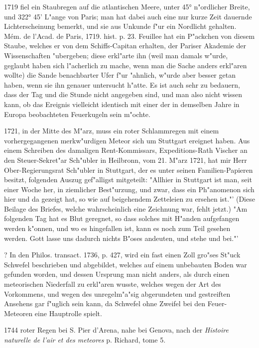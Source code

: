 \documentclass[a4paper, 11pt, oneside, polutonikogreek, german]{article}
\begin{document}
1719 fiel ein Staubregen auf die atlantischen Meere, unter 45° n"ordlicher Breite, und 322° 45' L"ange von Paris; man hat dabei auch eine nur kurze Zeit dauernde Lichterscheinung bemerkt, und sie aus Unkunde f"ur ein Nordlicht gehalten. Mém. de l'Acad. de Paris, 1719. hist. p. 23. Feuillee hat ein P"ackchen von diesem Staube, welches er von dem Schiffs-Capitan erhalten, der Pariser Akademie der Wissenschaften "ubergeben; diese erkl"arte ihn (weil man damals w"urde, geglaubt haben sich l"acherlich zu mache, wenn man die Sache anders erkl"aren wollte) die Sande benachbarter Ufer f"ur "ahnlich, w"urde aber besser getan haben, wenn sie ihn genauer untersucht h"atte. Es ist auch sehr zu bedauern, dass der Tag und die Stunde nicht angegeben sind, und man also nicht wissen kann, ob das Ereignis vielleicht identisch mit einer der in demselben Jahre in Europa beobachteten Feuerkugeln sein m"ochte.

1721, in der Mitte des M"arz, muss ein roter Schlammregen mit einem vorhergegangenen merkw"urdigen Meteor sich um Stuttgart ereignet haben. Aus einem Schreiben des damaligen Rent-Kommissars, Expeditions-Rath Vischer an den Steuer-Sekret"ar Sch"ubler in Heilbronn, vom 21. M"arz 1721, hat mir Herr Ober-Regierungsrat Sch"ubler in Stuttgart, der es unter seinen Familien-Papieren besitzt, folgenden Auszug gef"alligst mitgeteilt: "Allhier in Stuttgart ist man, seit einer Woche her, in ziemlicher Best"urzung, und zwar, dass ein Ph"anomenon sich hier und da gezeigt hat, so wie auf beigehendem Zetteleien zu ersehen ist."' (Diese Beilage des Briefes, welche wahrscheinlich eine Zeichnung war, fehlt jetzt.) "Am folgenden Tag hat es Blut geregnet, so dass solches mit H"anden aufgefangen werden k"onnen, und wo es hingefallen ist, kann es noch zum Teil gesehen werden. Gott lasse uns dadurch nichts B"oses andeuten, und stehe und bei."'

? In den Philos. transact. 1736, p. 427, wird ein fast einen Zoll gro"ses St"uck Schwefel beschrieben und abgebildet, welches auf einem unbebauten Boden war gefunden worden, und dessen Ursprung man nicht anders, als durch einen meteorischen Niederfall zu erkl"aren wusste, welches wegen der Art des Vorkommens, und wegen des unregelm"a"sig abgerundeten und gestreiften Ansehens gar f"uglich sein kann, da Schwefel ohne Zweifel bei den Feuer-Meteoren eine Hauptrolle spielt.

1744 roter Regen bei S. Pier d'Arena, nahe bei Genova, nach der \emph{Histoire naturelle de l'air et des meteores} p. Richard, tome 5.
\end{document}
